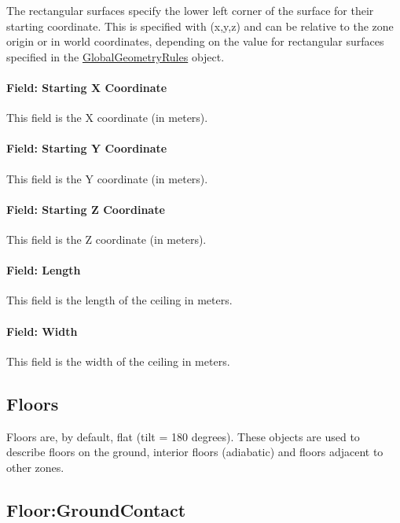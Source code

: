 The rectangular surfaces specify the lower left corner of the surface for their starting coordinate. This is specified with (x,y,z) and can be relative to the zone origin or in world coordinates, depending on the value for rectangular surfaces specified in the \hyperref[globalgeometryrules]{GlobalGeometryRules} object.

\paragraph{Field: Starting X Coordinate}\label{field-starting-x-coordinate-6}

This field is the X coordinate (in meters).

\paragraph{Field: Starting Y Coordinate}\label{field-starting-y-coordinate-6}

This field is the Y coordinate (in meters).

\paragraph{Field: Starting Z Coordinate}\label{field-starting-z-coordinate-6}

This field is the Z coordinate (in meters).

\paragraph{Field: Length}\label{field-length-6}

This field is the length of the ceiling in meters.

\paragraph{Field: Width}\label{field-width-2}

This field is the width of the ceiling in meters.

\subsection{Floors}\label{floors}

Floors are, by default, flat (tilt = 180 degrees). These objects are used to describe floors on the ground, interior floors (adiabatic) and floors adjacent to other zones.

\subsection{Floor:GroundContact}\label{floorgroundcontact}

